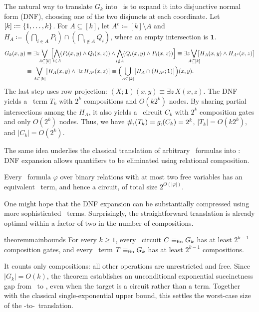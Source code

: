 The natural way to translate $G_k$ into \CoR\ is to expand it into disjunctive normal form (DNF),
choosing one of the two disjuncts at each coordinate.
Let $[k]\coloneqq\{ 1,\ldots,k \}$.
For $A\subseteq[k]$, let $A^c \coloneqq [k]\setminus A$ and
$H_A \coloneqq (\bigcap_{i\in A}P_i)\cap(\bigcap_{i\notin A}Q_i)$,
where an empty intersection is $\mathbf{1}$.
\begin{align*}
G_k(x,y)
&\equiv \exists z\!\!\bigvee_{A\subseteq[k]}
\Bigl[
\bigwedge_{\mathclap{i\in A}}(P_i(x,y)\land Q_i(x,z))
\land
\bigwedge_{\mathclap{i\notin A}}(Q_i(x,y)\land P_i(x,z))
\Bigr]
\equiv \exists z\bigvee_{\mathclap{A\subseteq[k]}}
\bigl[H_A(x,y)\land H_{A^c}(x,z)\bigr]
\\
&\equiv \bigvee_{A\subseteq[k]}
\bigl[H_A(x,y)\land\exists z\,H_{A^c}(x,z)\bigr]
\equiv \Bigl(\bigcup_{A\subseteq[k]}
\bigl[H_A\cap(H_{A^c};\mathbf{1})\bigr]\Bigr)(x,y).
\end{align*}
The last step uses row projection:
$(X;\mathbf{1})(x,y)\equiv\exists z\,X(x,z)$.
The DNF yields a \CoR\ term $T_k$ with $2^k$ compositions and $O(k2^k)$ nodes. By sharing partial intersections among the $H_A$, it also yields a \CoR\ circuit $C_k$ with $2^k$ composition gates and only $O(2^k)$ nodes.
Thus, we have
$\#_{;}(T_k)=g_{;}(C_k)=2^k$,
$|T_k|=O(k2^k)$, and $|C_k|=O(2^k)$.

The same idea underlies the classical translation of arbitrary \FOthree\ formulas into \CoR: DNF expansion allows quantifiers to be eliminated using relational composition.
\begin{proposition*}
Every \FOthree\ formula $\varphi$ over binary relations with at most two
free variables has an equivalent \CoR\ term, and hence a circuit, of total
size $2^{O(|\varphi|)}$.
\end{proposition*}

\smallskip
{}
One might hope that the DNF expansion can be substantially compressed using more sophisticated \CoR\ terms.
Surprisingly, the straightforward translation is already optimal within a factor of two in the number of compositions.

\begin{restatable}{theorem}{mainbounds}\label{thm:main}\label{main:G}
For every $k\ge1$, every \CoR\ circuit $C\equiv_{\mathrm{fin}} G_k$ has at least
$2^{k-1}$ composition gates, and every \CoR\ term $T\equiv_{\mathrm{fin}} G_k$ has at
least $2^{k-1}$ compositions.
\end{restatable}
It counts only compositions: all other operations are unrestricted and free.
Since $|G_k|=O(k)$, the theorem establishes an unconditional exponential succinctness gap from \FOthree\ to \CoR, even when the target is a circuit rather than a term.
%
Together with the classical single-exponential upper bound, this settles the worst-case size of the \FOthree-to-\CoR\ translation.

